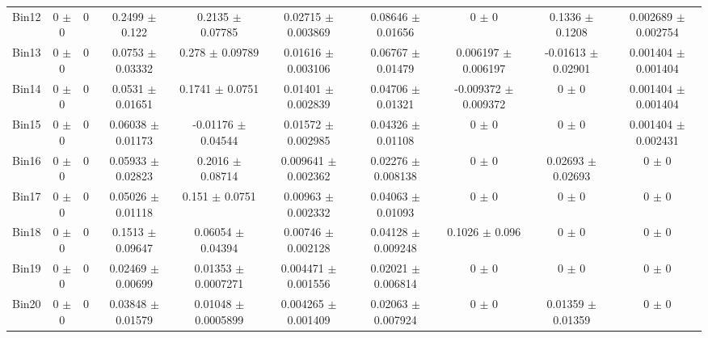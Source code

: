 \begin{tabular}{@{\extracolsep{4pt}}lccccccccc@{}}
     Bin12 & 0 $\pm$ 0 & 0 & 0.2499 $\pm$ 0.122 & 0.2135 $\pm$ 0.07785 & 0.02715 $\pm$ 0.003869 & 0.08646 $\pm$ 0.01656 & 0 $\pm$ 0 & 0.1336 $\pm$ 0.1208 & 0.002689 $\pm$ 0.002754 \\ 
     Bin13 & 0 $\pm$ 0 & 0 & 0.0753 $\pm$ 0.03332 & 0.278 $\pm$ 0.09789 & 0.01616 $\pm$ 0.003106 & 0.06767 $\pm$ 0.01479 & 0.006197 $\pm$ 0.006197 & -0.01613 $\pm$ 0.02901 & 0.001404 $\pm$ 0.001404 \\ 
     Bin14 & 0 $\pm$ 0 & 0 & 0.0531 $\pm$ 0.01651 & 0.1741 $\pm$ 0.0751 & 0.01401 $\pm$ 0.002839 & 0.04706 $\pm$ 0.01321 & -0.009372 $\pm$ 0.009372 & 0 $\pm$ 0 & 0.001404 $\pm$ 0.001404 \\ 
     Bin15 & 0 $\pm$ 0 & 0 & 0.06038 $\pm$ 0.01173 & -0.01176 $\pm$ 0.04544 & 0.01572 $\pm$ 0.002985 & 0.04326 $\pm$ 0.01108 & 0 $\pm$ 0 & 0 $\pm$ 0 & 0.001404 $\pm$ 0.002431 \\ 
     Bin16 & 0 $\pm$ 0 & 0 & 0.05933 $\pm$ 0.02823 & 0.2016 $\pm$ 0.08714 & 0.009641 $\pm$ 0.002362 & 0.02276 $\pm$ 0.008138 & 0 $\pm$ 0 & 0.02693 $\pm$ 0.02693 & 0 $\pm$ 0 \\ 
     Bin17 & 0 $\pm$ 0 & 0 & 0.05026 $\pm$ 0.01118 & 0.151 $\pm$ 0.0751 & 0.00963 $\pm$ 0.002332 & 0.04063 $\pm$ 0.01093 & 0 $\pm$ 0 & 0 $\pm$ 0 & 0 $\pm$ 0 \\ 
     Bin18 & 0 $\pm$ 0 & 0 & 0.1513 $\pm$ 0.09647 & 0.06054 $\pm$ 0.04394 & 0.00746 $\pm$ 0.002128 & 0.04128 $\pm$ 0.009248 & 0.1026 $\pm$ 0.096 & 0 $\pm$ 0 & 0 $\pm$ 0 \\ 
     Bin19 & 0 $\pm$ 0 & 0 & 0.02469 $\pm$ 0.00699 & 0.01353 $\pm$ 0.0007271 & 0.004471 $\pm$ 0.001556 & 0.02021 $\pm$ 0.006814 & 0 $\pm$ 0 & 0 $\pm$ 0 & 0 $\pm$ 0 \\ 
     Bin20 & 0 $\pm$ 0 & 0 & 0.03848 $\pm$ 0.01579 & 0.01048 $\pm$ 0.0005899 & 0.004265 $\pm$ 0.001409 & 0.02063 $\pm$ 0.007924 & 0 $\pm$ 0 & 0.01359 $\pm$ 0.01359 & 0 $\pm$ 0 \\ 
\hline\hline
  \end{tabular}
